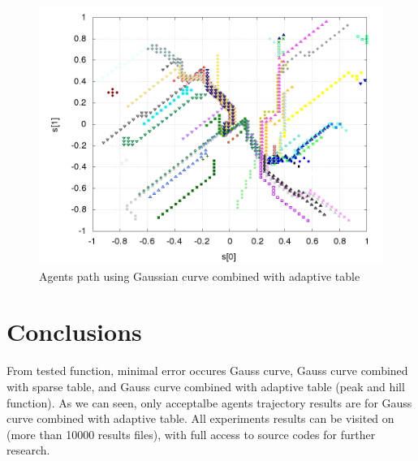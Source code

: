 \documentclass{acmbulletin}
\begin{document}
\begin{figure}[!htb]
\centering
\includegraphics[scale=.3]{../../results_q_learning/map_2/function_type_6/iterations_10/agents_path_surface.png}
\caption{Agents path using Gaussian curve combined with adaptive table}
\label{img:experiment_gauss_adaptive_table_path}
\end{figure}



\newpage
\section{Conclusions}

From tested function, minimal error occures Gauss curve, Gauss curve combined with sparse table,
and Gauss curve combined with adaptive table (peak and hill function). As we can seen, only
acceptalbe agents trajectory results are for Gauss curve combined with adaptive table.
All experiments results can be visited on \cite{bib:q_learning_git} (more than 10000 results files),
with full access to source codes for further research.


{
\litfont
}
%
%
\end{document}
